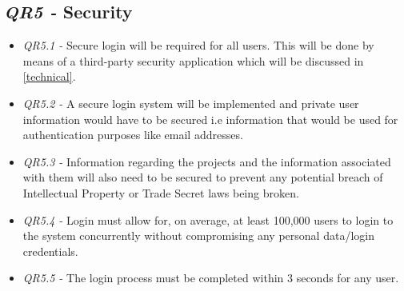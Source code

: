 \documentclass[11pt]{article}
\begin{document}
\subsection{\textit{QR5 -} Security}
\begin{itemize}
    \item \textit{QR5.1 -} Secure login will be required for all users. This will be done by means of a third-party security application which will be discussed in \ref{technical}.
    \item \textit{QR5.2 -} A secure login system will be implemented and private user information would have to be secured i.e information that would be used for authentication purposes like email addresses.
    \item \textit{QR5.3 -} Information regarding the projects and the information associated with them will also need to be secured to prevent any potential breach of Intellectual Property or Trade Secret laws being broken.
    \item \textit{QR5.4 -} Login must allow for, on average, at least 100,000 users to login to the system concurrently without compromising any personal data/login credentials.
    \item \textit{QR5.5 -} The login process must be completed within 3 seconds for any user.
    
\end{itemize}

\newpage
\end{document}
